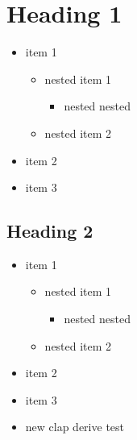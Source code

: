 \documentclass{article}
\begin{document}
 
\setcounter{secnumdepth}{0}

\section{Heading 1}

\begin{itemize}
    \item item 1
    \begin{itemize}
        \item nested item 1
        \begin{itemize}
            \item nested nested
        \end{itemize}

        \item nested item 2
    \end{itemize}

    \item item 2
    \item item 3
\end{itemize}

\subsection{Heading 2}

\begin{itemize}
    \item item 1
    \begin{itemize}
        \item nested item 1
        \begin{itemize}
            \item nested nested
        \end{itemize}

        \item nested item 2
    \end{itemize}

    \item item 2
    \item item 3
    \item new clap derive test
\end{itemize}
\end{document}
